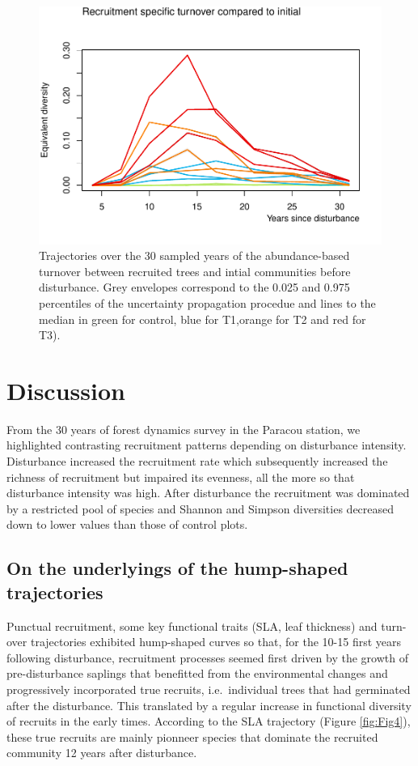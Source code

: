 \documentclass[fleqn,10pt]{ArtEcoFoG} %
\begin{document}
\begin{figure}

{\centering \includegraphics[width=0.5\linewidth]{RecruitmentTrajectories_files/figure-latex/Fig5-1} 

}

\caption{Trajectories over the 30 sampled years of the abundance-based turnover between recruited trees and intial communities before disturbance. Grey envelopes correspond to the 0.025 and 0.975 percentiles of the uncertainty propagation procedue and lines to the median in green for control, blue for T1,orange for T2 and red for T3).}\label{fig:Fig5}
\end{figure}

\section{Discussion}\label{discussion}

From the 30 years of forest dynamics survey in the Paracou station, we
highlighted contrasting recruitment patterns depending on disturbance
intensity. Disturbance increased the recruitment rate which subsequently
increased the richness of recruitment but impaired its evenness, all the
more so that disturbance intensity was high. After disturbance the
recruitment was dominated by a restricted pool of species and Shannon
and Simpson diversities decreased down to lower values than those of
control plots.

\subsection{On the underlyings of the hump-shaped
trajectories}\label{on-the-underlyings-of-the-hump-shaped-trajectories}

Punctual recruitment, some key functional traits (SLA, leaf thickness)
and turn-over trajectories exhibited hump-shaped curves so that, for the
10-15 first years following disturbance, recruitment processes seemed
first driven by the growth of pre-disturbance saplings that benefitted
from the environmental changes \citep{Herault2010} and progressively
incorporated true recruits, i.e.~individual trees that had germinated
after the disturbance. This translated by a regular increase in
functional diversity of recruits in the early times. According to the
SLA trajectory (Figure \ref{fig:Fig4}), these true recruits are mainly
pionneer species that dominate the recruited community 12 years after
disturbance.
\end{document}
